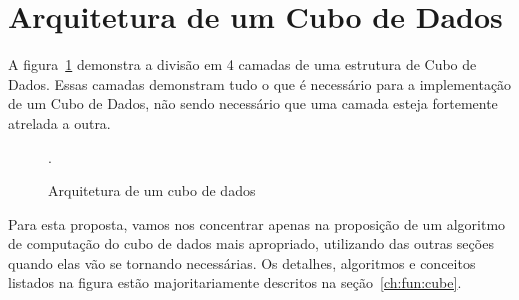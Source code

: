 \section{Arquitetura de um Cubo de Dados}
\label{ch:prop:cubearch}

A figura~\ref{fig:cubearch} demonstra a divisão em 4 camadas de uma estrutura de Cubo de Dados.
Essas camadas demonstram tudo o que é necessário para a implementação de um Cubo de Dados, não sendo necessário que uma camada esteja fortemente atrelada a outra.

\begin{figure}[ht]
	\caption{Arquitetura de um cubo de dados}
	\vspace{6mm}
	\begin{center}
	\end{center}
	\vspace{2mm}
	\legenda{}
	.
	\label{fig:cubearch}
\end{figure}

Para esta proposta, vamos nos concentrar apenas na proposição de um algoritmo de computação do cubo de dados mais apropriado, utilizando das outras seções quando elas vão se tornando necessárias.
Os detalhes, algoritmos e conceitos listados na figura estão majoritariamente descritos na seção~\ref{ch:fun:cube}.

